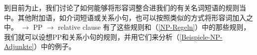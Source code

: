 \noindent
到目前为止，我们讨论了如何能够将形容词整合进我们的有关名词短语的规则当中。其他附加语，如介词短语或关系小句，也可以按照类似的方式将形容词加入\nbarc 之中。
\eal
\ex\label{xbar-PP-Adjunkt-an-N} \nbar $\to$ \nbar PP
\ex \nbar $\to$ \nbar relative clause
\zl
有了这些规则和（\ref{NP-Regeln}）中的那些规则，我们就可以设想PP和关系小句的规则，并用它们来分析（\ref{Beispiele-NP-Adjunkte}）中的例子。

